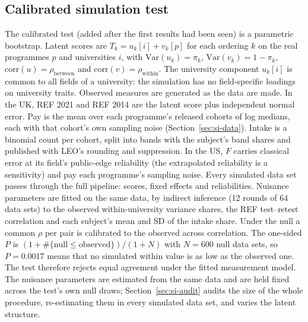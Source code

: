\documentclass[11pt]{article}
\begin{document}
\subsection{Calibrated simulation test}\label{sec:si-calib}

The calibrated test (added after the first results had been seen) is a parametric bootstrap. Latent scores are
$T_k=u_k[i]+v_k[p]$ for each ordering $k$ on the real programmes $p$ and universities $i$, with
$\mathrm{Var}(u_k)=\pi_k$, $\mathrm{Var}(v_k)=1-\pi_k$, $\mathrm{corr}(u)=\rho_{\mathrm{between}}$ and
$\mathrm{corr}(v)=\rho_{\mathrm{within}}$. The university component $u_k[i]$ is common to all fields of a university:
the simulation has no field-specific loadings on university traits. Observed measures are generated as the data are
made. In the UK, REF 2021 and REF 2014 are the latent score plus independent normal error. Pay is the mean over each
programme's released cohorts of log medians, each with that cohort's own sampling noise
(Section~\ref{sec:si-data}). Intake is a binomial count per cohort, split into bands with the subject's band shares
and published with LEO's rounding and suppression. In the US, $F$ carries classical error at its field's
public-edge reliability (the extrapolated reliability is a sensitivity) and pay each programme's sampling noise.
Every simulated data set passes through the full pipeline: scores, fixed effects and reliabilities. Nuisance
parameters are fitted on the same data, by indirect inference (12 rounds of 64 data sets) to the observed
within-university variance shares, the REF test--retest correlation and each subject's mean and SD of the intake
share. Under the null a common $\rho$ per pair is calibrated to the observed across correlation. The one-sided $P$
is $(1+\#\{\text{null}\le\text{observed}\})/(1+N)$ with $N=600$ null data sets, so $P=0.0017$ means that no
simulated within value is as low as the observed one. The test therefore rejects equal agreement under the fitted
measurement model. The nuisance parameters are estimated from the same data and are held fixed across the test's own
null draws; Section~\ref{sec:si-audit} audits the size of the whole procedure, re-estimating them in every simulated
data set, and varies the latent structure.
\end{document}
